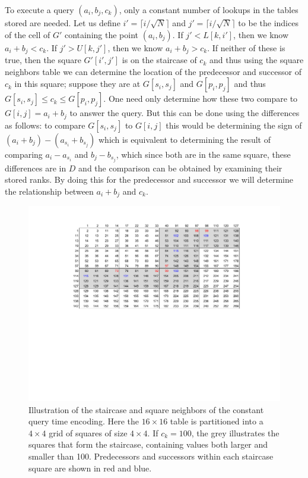 To execute a query $(a_i,b_j,c_k)$, only a constant number of lookups in the
tables stored are needed.
Let us define \(i' = \lceil i / \sqrt{N} \rceil\)
and \(j' = \lceil i / \sqrt{N} \rceil\) to be the indices of the cell of
\(G'\) containing the point \((a_i, b_j)\).
If $j' < L[k,i']$, then we know $a_i + b_j < c_k$.
If $j' > U[k,j']$, then we know $a_i + b_j > c_k$.
If neither of these is true, then the square $G'[i',j']$ is on the staircase of
$c_k$ and thus using
the square neighbors table we can determine the location of the predecessor and
successor of $c_k$ in this square; suppose they are at $G[s_i,s_j]$ and
$G[p_i,p_j]$ and thus $G[s_i,s_j] \leq c_k \leq G[p_i,p_j]$. One need only
determine how these two compare to $G[i,j]=a_i+b_j$ to answer the query. But
this can be done using the differences as follows: to compare $G[s_i,s_j]$ to
$G[i,j]$ this would be determining the sign of $(a_i+b_j)-(a_{s_i}+b_{s_j})$
which is equivalent to determining the result of comparing $a_i-a_{s_i}$ and
$b_j-b_{s_j}$, which since both are in the same square, these differences are
in $D$ and the comparison can be obtained by examining their stored ranks. By
doing this for the predecessor and successor we will determine the relationship
between $a_i+b_j$ and $c_k$.

\begin{figure}
\centering
\includegraphics[trim={4cm 10cm 3cm 2cm},clip,width=5.5in]{figures/stair}
\caption{Illustration of the staircase and square neighbors of the constant query time encoding. Here the $16\times16$ table is partitioned into a $4\times 4$ grid of squares of size $4\times 4$. If $c_k=100$, the grey illustrates the squares that form the staircase, containing values both larger and smaller than 100. Predecessors and successors within each staircase square are shown in red and blue.}
\end{figure}

